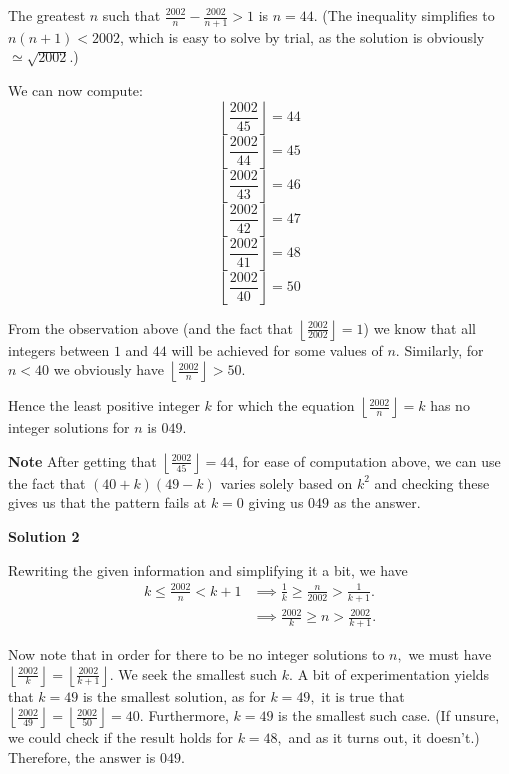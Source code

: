 \begin{enumerate}
 The greatest $n$ such that $\frac{2002}n - \frac{2002}{n+1} > 1$ is $n=44$. (The inequality simplifies to $n(n+1)<2002$, which is easy to solve by trial, as the solution is obviously $\simeq \sqrt{2002}$.)

 
We can now compute:
 \[\left\lfloor\frac{2002}{45}\right\rfloor=44\]
 \[\left\lfloor\frac{2002}{44}\right\rfloor=45\]
 \[\left\lfloor\frac{2002}{43}\right\rfloor=46\]
 \[\left\lfloor\frac{2002}{42}\right\rfloor=47\]
 \[\left\lfloor\frac{2002}{41}\right\rfloor=48\]
 \[\left\lfloor\frac{2002}{40}\right\rfloor=50\]

 From the observation above (and the fact that $\left\lfloor\frac{2002}{2002}\right\rfloor=1$) we know that all integers between $1$ and $44$ will be achieved for some values of $n$. Similarly, for $n<40$ we obviously have $\left\lfloor\frac{2002}{n}\right\rfloor > 50$.

 Hence the least positive integer $k$ for which the equation $\left\lfloor\frac{2002}{n}\right\rfloor=k$ has no integer solutions for $n$ is $\boxed{049}$.

 \textbf{Note} After getting that $\left\lfloor\frac{2002}{45}\right\rfloor=44$, for ease of computation above, we can use the fact that $(40+k)(49-k)$ varies solely based on $k^2$ and checking these gives us that the pattern fails at $k=0$ giving us $\boxed{049}$ as the answer.

 



\textbf{Solution 2}

Rewriting the given information and simplifying it a bit, we have
 \begin{align*}  k \le \frac{2002}{n} < k+1 &\implies \frac{1}{k} \ge \frac{n}{2002} > \frac{1}{k+1}. \\ &\implies \frac{2002}{k} \ge n > \frac{2002}{k+1}.   \end{align*}


 Now note that in order for there to be no integer solutions to $n,$ we must have $\left\lfloor \frac{2002}{k} \right\rfloor = \left\lfloor \frac{2002}{k+1} \right\rfloor.$ We seek the smallest such $k.$ A bit of experimentation yields that $k=49$ is the smallest solution, as for $k=49,$ it is true that $\left\lfloor \frac{2002}{49} \right\rfloor = \left\lfloor \frac{2002}{50} \right\rfloor = 40.$ Furthermore, $k=49$ is the smallest such case. (If unsure, we could check if the result holds for $k=48,$ and as it turns out, it doesn't.) Therefore, the answer is $\boxed{049}.$





\end{enumerate}
